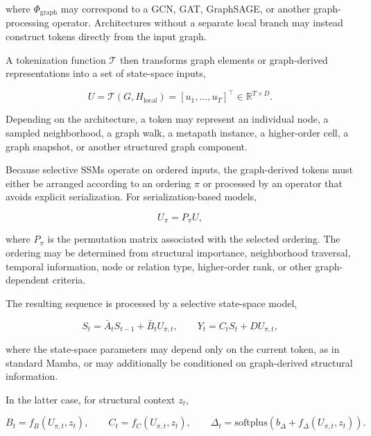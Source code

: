 \documentclass[acmsmall]{acmart}
\begin{document}
where $\Phi_{\mathrm{graph}}$ may correspond to a GCN, GAT, GraphSAGE, or
another graph-processing operator. Architectures without a separate local
branch may instead construct tokens directly from the input graph.

A tokenization function $\mathcal{T}$ then transforms graph elements or
graph-derived representations into a set of state-space inputs,

\begin{equation}
U
=
\mathcal{T}(G,H_{\mathrm{local}})
=
[u_1,\ldots,u_T]^\top
\in\mathbb{R}^{T\times D}.
\label{eq:graph-tokenization}
\end{equation}

Depending on the architecture, a token may represent an individual node, a
sampled neighborhood, a graph walk, a metapath instance, a higher-order cell,
a graph snapshot, or another structured graph component.

Because selective SSMs operate on ordered inputs, the graph-derived tokens
must either be arranged according to an ordering $\pi$ or processed by an
operator that avoids explicit serialization. For serialization-based models,

\begin{equation}
U_{\pi}
=
P_{\pi}U,
\label{eq:serialization}
\end{equation}

where $P_{\pi}$ is the permutation matrix associated with the selected
ordering. The ordering may be determined from structural importance,
neighborhood traversal, temporal information, node or relation type,
higher-order rank, or other graph-dependent criteria.

The resulting sequence is processed by a selective state-space model,

\begin{equation}
S_t
=
\bar{A}_t S_{t-1}
+
\bar{B}_t U_{\pi,t},
\qquad
Y_t
=
C_t S_t
+
D U_{\pi,t},
\label{eq:graph-mamba-state}
\end{equation}

where the state-space parameters may depend only on the current token, as in
standard Mamba, or may additionally be conditioned on graph-derived structural
information. 

In the latter case, for structural context $z_t$,

\begin{equation}
B_t=f_B(U_{\pi,t},z_t),\qquad
C_t=f_C(U_{\pi,t},z_t),\qquad
\Delta_t=
\mathrm{softplus}
\left(
b_{\Delta}+f_{\Delta}(U_{\pi,t},z_t)
\right).
\label{eq:graph-conditioned-selection}
\end{equation}
\end{document}

